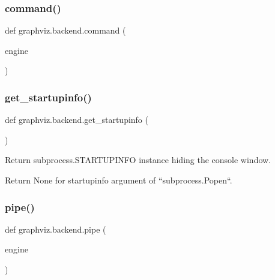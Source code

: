 \subsubsection{\texorpdfstring{command()}{command()}}
{\footnotesize\ttfamily def graphviz.\+backend.\+command (\begin{DoxyParamCaption}\item[{}]{engine }\end{DoxyParamCaption})}

\mbox{\label{namespacegraphviz_1_1backend_a6ce9f12deeddd6800e99eb28917c0694}} 
\subsubsection{\texorpdfstring{get\+\_\+startupinfo()}{get\_startupinfo()}}
{\footnotesize\ttfamily def graphviz.\+backend.\+get\+\_\+startupinfo (\begin{DoxyParamCaption}{ }\end{DoxyParamCaption})}

\begin{DoxyVerb}Return subprocess.STARTUPINFO instance hiding the console window.\end{DoxyVerb}


\begin{DoxyVerb}Return None for startupinfo argument of ``subprocess.Popen``.\end{DoxyVerb}
 \mbox{\label{namespacegraphviz_1_1backend_ac97a4806e0f00ac9af2a14434af13bed}} 
\subsubsection{\texorpdfstring{pipe()}{pipe()}}
{\footnotesize\ttfamily def graphviz.\+backend.\+pipe (\begin{DoxyParamCaption}\item[{}]{engine }\end{DoxyParamCaption})}

\mbox{\label{namespacegraphviz_1_1backend_a55b58f5b91d47863d02f536d4b883a23}} 
